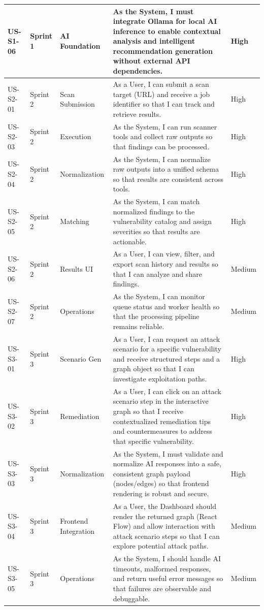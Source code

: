 {\begin{longtable}{|>{\centering\arraybackslash}p{1.4cm}|>{\centering\arraybackslash}p{2cm}|>{\centering\arraybackslash}p{2.2cm}|>{\raggedright\arraybackslash}p{7.5cm}|>{\centering\arraybackslash}p{1.2cm}|}
        \hline
        US-S1-06 & Sprint 1 & AI Foundation & As the System, I must integrate Ollama for local AI inference to enable contextual analysis and intelligent recommendation generation without external API dependencies. & High \\
        \hline
        US-S2-01 & Sprint 2 & Scan Submission & As a User, I can submit a scan target (URL) and receive a job identifier so that I can track and retrieve results. & High \\
        \hline
        US-S2-03 & Sprint 2 & Execution & As the System, I can run scanner tools and collect raw outputs so that findings can be processed. & High \\
        \hline
        US-S2-04 & Sprint 2 & Normalization & As the System, I can normalize raw outputs into a unified schema so that results are consistent across tools. & High \\
        \hline
        US-S2-05 & Sprint 2 & Matching & As the System, I can match normalized findings to the vulnerability catalog and assign severities so that results are actionable. & High \\
        \hline
        US-S2-06 & Sprint 2 & Results UI & As a User, I can view, filter, and export scan history and results so that I can analyze and share findings. & Medium \\
        \hline
        US-S2-07 & Sprint 2 & Operations & As the System, I can monitor queue status and worker health so that the processing pipeline remains reliable. & Medium \\
        \hline
        US-S3-01 & Sprint 3 & Scenario Gen & As a User, I can request an attack scenario for a specific vulnerability and receive structured steps and a graph object so that I can investigate exploitation paths. & High \\
        \hline
        US-S3-02 & Sprint 3 & Remediation & As a User, I can click on an attack scenario step in the interactive graph so that I receive contextualized remediation tips and countermeasures to address that specific vulnerability. & High \\
        \hline
        US-S3-03 & Sprint 3 & Normalization & As the System, I must validate and normalize AI responses into a safe, consistent graph payload (nodes/edges) so that frontend rendering is robust and secure. & High \\
        \hline
        US-S3-04 & Sprint 3 & Frontend Integration & As a User, the Dashboard should render the returned graph (React Flow) and allow interaction with attack scenario steps so that I can explore potential attack paths. & Medium \\
        \hline
        US-S3-05 & Sprint 3 & Operations & As the System, I should handle AI timeouts, malformed responses, and return useful error messages so that failures are observable and debuggable. & Medium \\
        \hline
    \end{longtable}
    }
